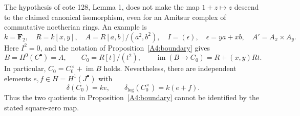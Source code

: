 \begin{proposition}
\label{A4:boundary-counterexample}
The hypothesis of cote 128, Lemma 1, does not make the map $1+z\mapsto z$
descend to the claimed canonical isomorphism, even for an Amitsur complex
of commutative noetherian rings.  An example is
\[
 k=\mathbf F_2,\quad R=k[x,y],\quad
 A=R[a,b]/(a^2,b^2),\quad
 I=(\epsilon),\quad\epsilon=ya+xb,\quad A'=A_x\times A_y.
\]
Here $I^2=0$, and the notation of Proposition~\ref{A4:boundary} gives
\[
 B=H^0(C^\bullet)=A,\qquad
 C_0=R[t]/(t^2),\qquad
 \operatorname{im}(B\to C_0)=R+(x,y)Rt.
\]
In particular, $C_0=C_0^\times+\operatorname{im}B$ holds.  Nevertheless,
there are independent elements $e,f\in H=H^1(J^\bullet)$ with
\[
       \delta(C_0)=k e,\qquad
       \delta_{\log}(C_0^\times)=k(e+f).
\]
Thus the two quotients in Proposition~\ref{A4:boundary} cannot be identified
by the stated square-zero map.
\end{proposition}
